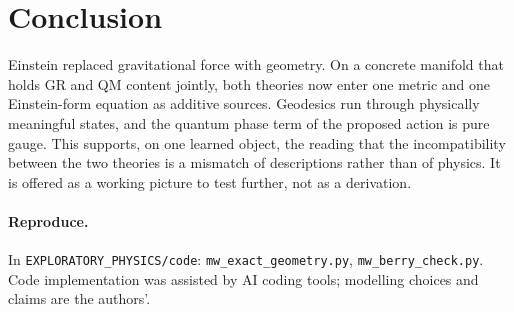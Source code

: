 \documentclass[11pt]{article}
\begin{document}
\section{Conclusion}
Einstein replaced gravitational force with geometry. On a concrete manifold that holds GR and QM
content jointly, both theories now enter one metric and one Einstein-form equation as additive
sources. Geodesics run through physically meaningful states, and the quantum phase term of the
proposed action is pure gauge. This supports, on one learned object, the reading that the
incompatibility between the two theories is a mismatch of descriptions rather than of physics.
It is offered as a working picture to test further, not as a derivation.

\paragraph{Reproduce.} In \texttt{EXPLORATORY\_PHYSICS/code}:
\texttt{mw\_exact\_geometry.py}, \texttt{mw\_berry\_check.py}. Code implementation was assisted by
AI coding tools; modelling choices and claims are the authors'.
\end{document}
